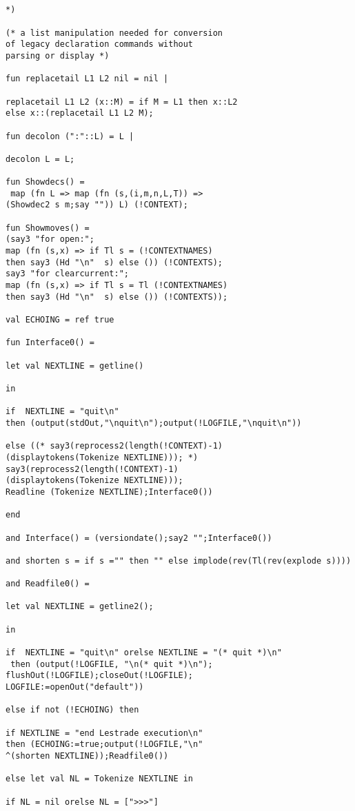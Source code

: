 \documentclass[12pt]{article}
\begin{document}
\begin{verbatim}


*)

(* a list manipulation needed for conversion
of legacy declaration commands without
parsing or display *)

fun replacetail L1 L2 nil = nil |

replacetail L1 L2 (x::M) = if M = L1 then x::L2
else x::(replacetail L1 L2 M);

fun decolon (":"::L) = L |

decolon L = L;

fun Showdecs() =
 map (fn L => map (fn (s,(i,m,n,L,T)) => 
(Showdec2 s m;say "")) L) (!CONTEXT);

fun Showmoves() =
(say3 "for open:";
map (fn (s,x) => if Tl s = (!CONTEXTNAMES) 
then say3 (Hd "\n"  s) else ()) (!CONTEXTS);
say3 "for clearcurrent:";
map (fn (s,x) => if Tl s = Tl (!CONTEXTNAMES) 
then say3 (Hd "\n"  s) else ()) (!CONTEXTS));

val ECHOING = ref true 

fun Interface0() =

let val NEXTLINE = getline()

in

if  NEXTLINE = "quit\n" 
then (output(stdOut,"\nquit\n");output(!LOGFILE,"\nquit\n"))

else ((* say3(reprocess2(length(!CONTEXT)-1)
(displaytokens(Tokenize NEXTLINE))); *)
say3(reprocess2(length(!CONTEXT)-1)
(displaytokens(Tokenize NEXTLINE)));
Readline (Tokenize NEXTLINE);Interface0())

end

and Interface() = (versiondate();say2 "";Interface0())

and shorten s = if s ="" then "" else implode(rev(Tl(rev(explode s))))

and Readfile0() =

let val NEXTLINE = getline2();

in

if  NEXTLINE = "quit\n" orelse NEXTLINE = "(* quit *)\n"
 then (output(!LOGFILE, "\n(* quit *)\n");
flushOut(!LOGFILE);closeOut(!LOGFILE);
LOGFILE:=openOut("default"))

else if not (!ECHOING) then

if NEXTLINE = "end Lestrade execution\n" 
then (ECHOING:=true;output(!LOGFILE,"\n"
^(shorten NEXTLINE));Readfile0())

else let val NL = Tokenize NEXTLINE in

if NL = nil orelse NL = [">>>"]


\end{verbatim}
\end{document}
